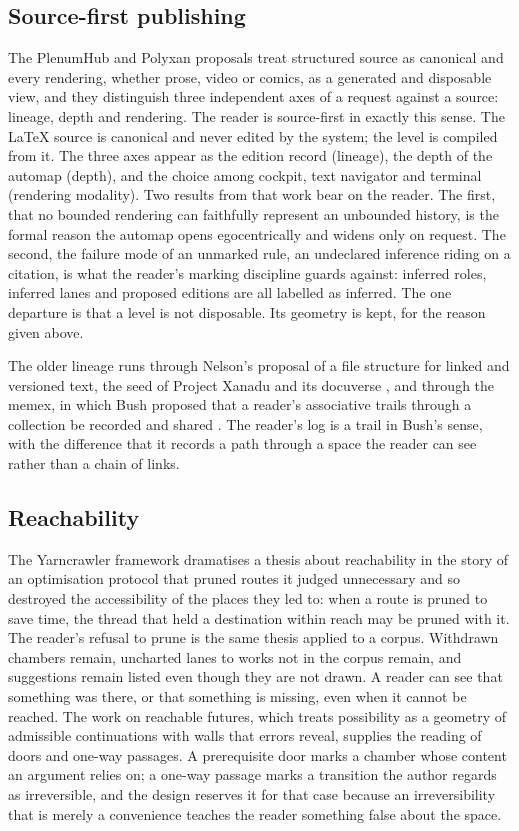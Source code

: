\documentclass[11pt]{article}
\theoremstyle{remark}
\begin{document}
\subsection{Source-first publishing}

The PlenumHub and Polyxan proposals treat structured source as canonical and every rendering, whether prose, video or comics, as a generated and disposable view, and they distinguish three independent axes of a request against a source: lineage, depth and rendering. The reader is source-first in exactly this sense. The LaTeX source is canonical and never edited by the system; the level is compiled from it. The three axes appear as the edition record (lineage), the depth of the automap (depth), and the choice among cockpit, text navigator and terminal (rendering modality). Two results from that work bear on the reader. The first, that no bounded rendering can faithfully represent an unbounded history, is the formal reason the automap opens egocentrically and widens only on request. The second, the failure mode of an unmarked rule, an undeclared inference riding on a citation, is what the reader's marking discipline guards against: inferred roles, inferred lanes and proposed editions are all labelled as inferred. The one departure is that a level is not disposable. Its geometry is kept, for the reason given above.

The older lineage runs through Nelson's proposal of a file structure for linked and versioned text, the seed of Project Xanadu and its docuverse \cite{nelson1965}, and through the memex, in which Bush proposed that a reader's associative trails through a collection be recorded and shared \cite{bush1945}. The reader's log is a trail in Bush's sense, with the difference that it records a path through a space the reader can see rather than a chain of links.

\subsection{Reachability}

The Yarncrawler framework dramatises a thesis about reachability in the story of an optimisation protocol that pruned routes it judged unnecessary and so destroyed the accessibility of the places they led to: when a route is pruned to save time, the thread that held a destination within reach may be pruned with it. The reader's refusal to prune is the same thesis applied to a corpus. Withdrawn chambers remain, uncharted lanes to works not in the corpus remain, and suggestions remain listed even though they are not drawn. A reader can see that something was there, or that something is missing, even when it cannot be reached. The work on reachable futures, which treats possibility as a geometry of admissible continuations with walls that errors reveal, supplies the reading of doors and one-way passages. A prerequisite door marks a chamber whose content an argument relies on; a one-way passage marks a transition the author regards as irreversible, and the design reserves it for that case because an irreversibility that is merely a convenience teaches the reader something false about the space.
\end{document}
